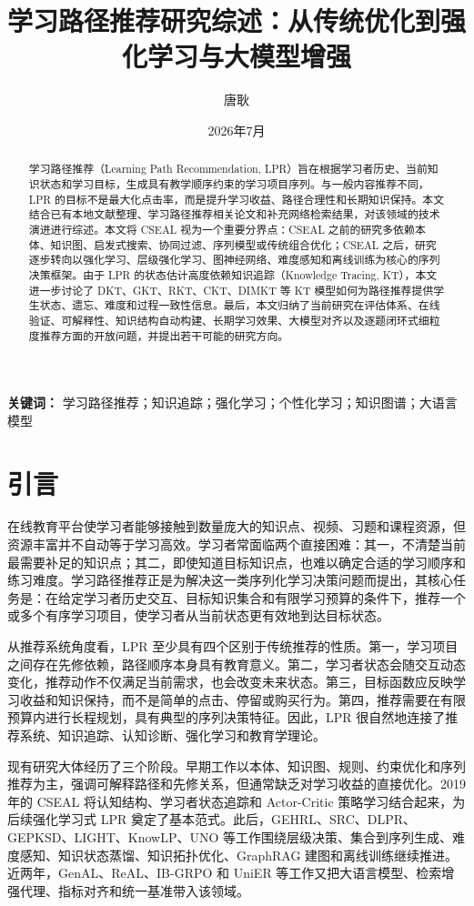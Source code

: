 \documentclass[UTF8,a4paper,zihao=-4]{ctexart}
\title{\heiti 学习路径推荐研究综述：从传统优化到强化学习与大模型增强}
\author{唐耿}
\date{2026年7月}
\begin{document}
\maketitle

\begin{abstract}
学习路径推荐（Learning Path Recommendation, LPR）旨在根据学习者历史、当前知识状态和学习目标，生成具有教学顺序约束的学习项目序列。与一般内容推荐不同，LPR 的目标不是最大化点击率，而是提升学习收益、路径合理性和长期知识保持。本文结合已有本地文献整理、学习路径推荐相关论文和补充网络检索结果，对该领域的技术演进进行综述。本文将 CSEAL 视为一个重要分界点：CSEAL 之前的研究多依赖本体、知识图、启发式搜索、协同过滤、序列模型或传统组合优化；CSEAL 之后，研究逐步转向以强化学习、层级强化学习、图神经网络、难度感知和离线训练为核心的序列决策框架。由于 LPR 的状态估计高度依赖知识追踪（Knowledge Tracing, KT），本文进一步讨论了 DKT、GKT、RKT、CKT、DIMKT 等 KT 模型如何为路径推荐提供学生状态、遗忘、难度和过程一致性信息。最后，本文归纳了当前研究在评估体系、在线验证、可解释性、知识结构自动构建、长期学习效果、大模型对齐以及逐题闭环式细粒度推荐方面的开放问题，并提出若干可能的研究方向。
\end{abstract}

\noindent\textbf{关键词：} 学习路径推荐；知识追踪；强化学习；个性化学习；知识图谱；大语言模型

\section{引言}

在线教育平台使学习者能够接触到数量庞大的知识点、视频、习题和课程资源，但资源丰富并不自动等于学习高效。学习者常面临两个直接困难：其一，不清楚当前最需要补足的知识点；其二，即使知道目标知识点，也难以确定合适的学习顺序和练习难度。学习路径推荐正是为解决这一类序列化学习决策问题而提出，其核心任务是：在给定学习者历史交互、目标知识集合和有限学习预算的条件下，推荐一个或多个有序学习项目，使学习者从当前状态更有效地到达目标状态。

从推荐系统角度看，LPR 至少具有四个区别于传统推荐的性质。第一，学习项目之间存在先修依赖，路径顺序本身具有教育意义。第二，学习者状态会随交互动态变化，推荐动作不仅满足当前需求，也会改变未来状态。第三，目标函数应反映学习收益和知识保持，而不是简单的点击、停留或购买行为。第四，推荐需要在有限预算内进行长程规划，具有典型的序列决策特征。因此，LPR 很自然地连接了推荐系统、知识追踪、认知诊断、强化学习和教育学理论。

现有研究大体经历了三个阶段。早期工作以本体、知识图、规则、约束优化和序列推荐为主，强调可解释路径和先修关系，但通常缺乏对学习收益的直接优化。2019 年的 CSEAL 将认知结构、学习者状态追踪和 Actor-Critic 策略学习结合起来，为后续强化学习式 LPR 奠定了基本范式\cite{Liu2019CSEAL}。此后，GEHRL、SRC、DLPR、GEPKSD、LIGHT、KnowLP、UNO 等工作围绕层级决策、集合到序列生成、难度感知、知识状态蒸馏、知识拓扑优化、GraphRAG 建图和离线训练继续推进\cite{Li2023GEHRL,Chen2023SRC,Zhang2024DLPR,Li2024GEPKSD,Yu2025LIGHT,Cheng2025KnowLP,Peng2026UNO}。近两年，GenAL、ReAL、IB-GRPO 和 UniER 等工作又把大语言模型、检索增强代理、指标对齐和统一基准带入该领域\cite{Lv2025GenAL,Lv2025ReAL,Wang2026IBGRPO,Cheng2026UniER}。
\end{document}
